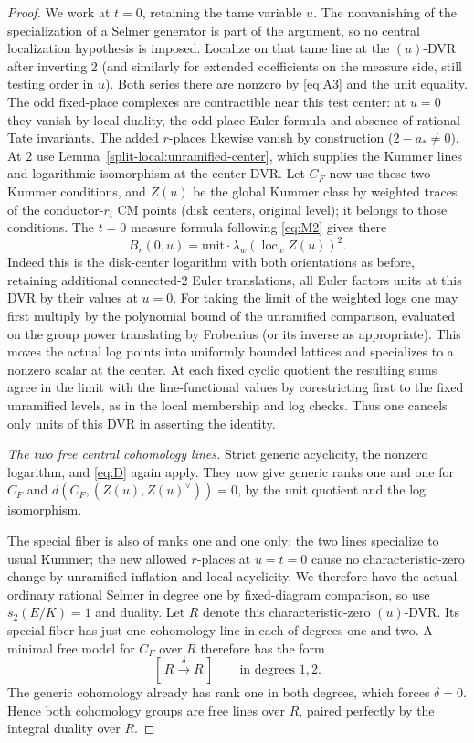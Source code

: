 \begin{proof}

We work at \(t=0\), retaining the tame variable \(u\). The nonvanishing of the specialization of a Selmer generator is part of the argument, so no central localization hypothesis is imposed. Localize on that tame line at the \((u)\)-DVR after inverting 2 (and similarly for extended coefficients on the measure side, still testing order in \(u\)). Both series there are nonzero by \eqref{eq:A3} and the unit equality. The odd fixed-place complexes are contractible near this test center: at \(u=0\) they vanish by local duality, the odd-place Euler formula and absence of rational Tate invariants. The added \(r\)-places likewise vanish by construction (\(2-a_*\ne0\)). At \(2\) use Lemma~\ref{split-local:unramified-center}, which supplies the Kummer lines and logarithmic isomorphism at the center DVR. Let \(C_F\) now use these two Kummer conditions, and \(Z(u)\) be the global Kummer class by weighted traces of the conductor-\(r_i\) CM points (disk centers, original level); it belongs to those conditions. The \(t=0\) measure formula following \eqref{eq:M2} gives there
\[
             B_r(0,u)=\text{unit}\cdot\lambda_w(\operatorname{loc}_w Z(u))^2 .
\]
Indeed this is the disk-center logarithm with both orientations as before, retaining additional connected-2 Euler translations, all Euler factors units at this DVR by their values at \(u=0\). For taking the limit of the weighted logs one may first multiply by the polynomial bound of the unramified comparison, evaluated on the group power translating by Frobenius (or its inverse as appropriate). This moves the actual log points into uniformly bounded lattices and specializes to a nonzero scalar at the center. At each fixed cyclic quotient the resulting sums agree in the limit with the line-functional values by corestricting first to the fixed unramified levels, as in the local membership and log checks. Thus one cancels only units of this DVR in asserting the identity.

\smallskip\noindent\emph{The two free central cohomology lines.}
Strict generic acyclicity, the nonzero logarithm, and \eqref{eq:D} again apply. They now give generic ranks one and one for \(C_F\) and \(d(C_F,(Z(u),Z(u)^\vee))=0\), by the unit quotient and the log isomorphism.

The special fiber is also of ranks one and one only: the two lines specialize to usual Kummer; the new allowed \(r\)-places at \(u=t=0\) cause no characteristic-zero change by unramified inflation and local acyclicity. We therefore have the actual ordinary rational Selmer in degree one by fixed-diagram comparison, so use \(s_2(E/K)=1\) and duality. Let \(R\) denote this characteristic-zero \((u)\)-DVR. Its special fiber has just one cohomology line in each of degrees one and two. A minimal free model for \(C_F\) over \(R\) therefore has the form
\[
 [\,R\xrightarrow{\delta}R\,]\qquad\text{in degrees }1,2.
\]
The generic cohomology already has rank one in both degrees, which forces \(\delta=0\). Hence both cohomology groups are free lines over \(R\), paired perfectly by the integral duality over \(R\).


\end{proof}
